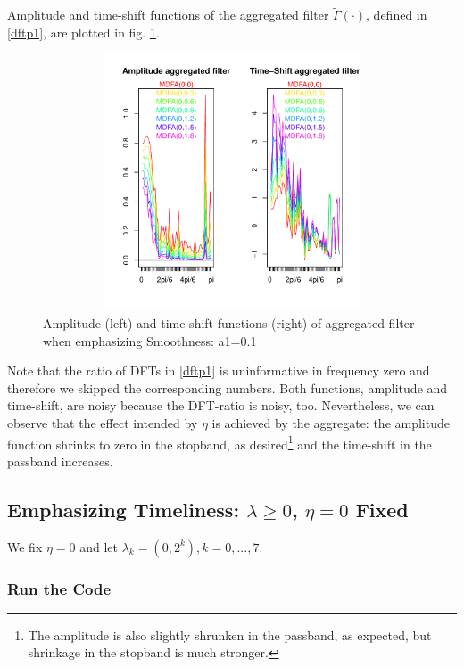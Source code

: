 \documentclass[a4paper]{book}
\begin{document}
Amplitude and time-shift functions of the aggregated filter $\tilde{\Gamma}(\cdot)$, defined in \ref{dftp1}, are plotted in fig. \ref{z_amp_shift_mdfacust_leadind_agg_S}.
\begin{figure}[H]\begin{center}\includegraphics[height=3in, width=6in]{z_amp_shift_mdfacust_leadind_agg_S}\caption{Amplitude (left) and time-shift functions (right) of aggregated filter when emphasizing Smoothness: a1=0.1\label{z_amp_shift_mdfacust_leadind_agg_S}}\end{center}\end{figure}Note that the ratio of DFTs in \ref{dftp1} is uninformative in frequency zero and therefore we skipped the corresponding numbers. Both functions, amplitude and time-shift, are noisy because the DFT-ratio is noisy, too. Nevertheless, we can observe that the effect intended by $\eta$ is achieved by the aggregate: the amplitude function shrinks to zero in the stopband, as desired\footnote{The amplitude is also slightly shrunken in the passband, as expected, but shrinkage in the stopband is much stronger.} and the time-shift in the passband increases.







\subsection{Emphasizing Timeliness: $\lambda\geq 0$, $\eta=0$ Fixed}

We fix $\eta=0$ and let $\lambda_k=(0,2^k), k=0,...,7$.

\subsubsection{Run the Code}
\end{document}
